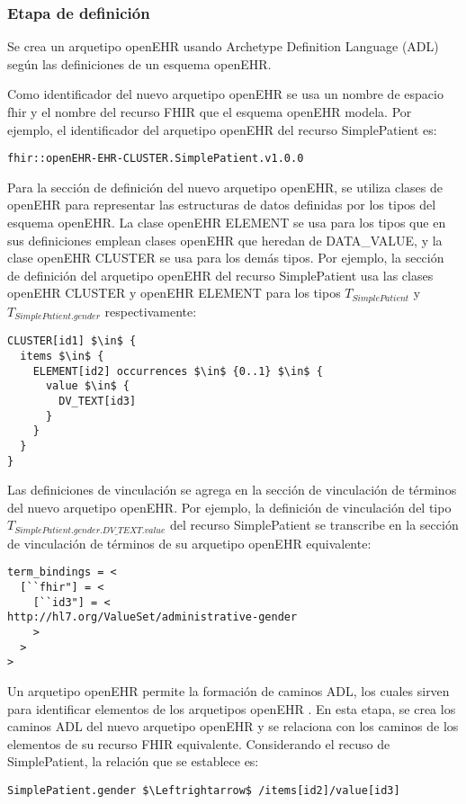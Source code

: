 \subsubsection{Etapa de definición}

Se crea un arquetipo openEHR usando Archetype Definition Language (ADL) \cite{openEHRADL} según las definiciones de un esquema openEHR.

Como identificador del nuevo arquetipo openEHR se usa un nombre de espacio fhir y el nombre del recurso FHIR que el esquema openEHR modela. Por ejemplo, el identificador del arquetipo openEHR del recurso SimplePatient es:

\begin{lstlisting}
fhir::openEHR-EHR-CLUSTER.SimplePatient.v1.0.0
\end{lstlisting}

Para la sección de definición del nuevo arquetipo openEHR, se utiliza clases de openEHR para representar las estructuras de datos definidas por los tipos del esquema openEHR. La clase openEHR ELEMENT se usa para los tipos que en sus definiciones emplean clases openEHR que heredan de DATA\_VALUE, y la clase openEHR CLUSTER se usa para los demás tipos. Por ejemplo, la sección de definición del arquetipo openEHR del recurso SimplePatient usa las clases openEHR CLUSTER y openEHR ELEMENT para los tipos \(T_{SimplePatient}\) y \(T_{SimplePatient.gender}\) respectivamente:

\begin{lstlisting}[mathescape=true]
CLUSTER[id1] $\in$ {
  items $\in$ {
    ELEMENT[id2] occurrences $\in$ {0..1} $\in$ {
      value $\in$ {
        DV_TEXT[id3]
      }
    }
  }
}
\end{lstlisting}

Las definiciones de vinculación se agrega en la sección de vinculación de términos del nuevo arquetipo openEHR. Por ejemplo, la definición de vinculación del tipo \(T_{SimplePatient.gender.DV\_TEXT.value}\) del recurso SimplePatient se transcribe en la sección de vinculación de términos de su arquetipo openEHR equivalente:

\begin{lstlisting}
term_bindings = <
  [``fhir"] = <
    [``id3"] = <
http://hl7.org/ValueSet/administrative-gender
    >
  >
>
\end{lstlisting}

Un arquetipo openEHR permite la formación de caminos ADL, los cuales sirven para identificar elementos de los arquetipos openEHR \cite{openEHRArchitecture}. En esta etapa, se crea los caminos ADL del nuevo arquetipo openEHR y se relaciona con los caminos de los elementos de su recurso FHIR equivalente. Considerando el recuso de SimplePatient, la relación que se establece es:

\begin{lstlisting}[mathescape=true]
SimplePatient.gender $\Leftrightarrow$ /items[id2]/value[id3]
\end{lstlisting}
